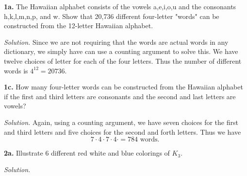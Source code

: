 \documentclass{article}
\begin{document}
\setlength{\parindent}{0cm}   %



\textbf{1a.} The Hawaiian alphabet consists of the vowels a,e,i,o,u and the consonants h,k,l,m,n,p, and w. Show that 20,736 different four-letter "words" can be constructed from the 12-letter Hawaiian alphabet. 
\vspace{2mm}

\textit{Solution.} Since we are not requiring that the words are actual words in any dictionary, we simply have can use a counting argument to solve this. We have twelve choices of letter for each of the four letters. Thus the number of different words is \(4^{12} = 20736\). 

\vspace{3mm}

\textbf{1c.} How many four-letter words can be constructed from the Hawaiian alphabet if the first and third letters are consonants and the second and last letters are vowels?

\vspace{2mm}


\textit{Solution.} Again, using a counting argument, we have seven choices for the first and third letters and five choices for the second and forth letters. Thus we have 
\[
7\cdot4\cdot7\cdot4\cdot = 784 \text{ words. } 
\]

\vspace{4mm}

\textbf{2a.} Illustrate 6 different red white and blue colorings of \(K_3\). 


\vspace{2mm}

\textit{Solution.} 

\vspace{2mm}
\end{document}
